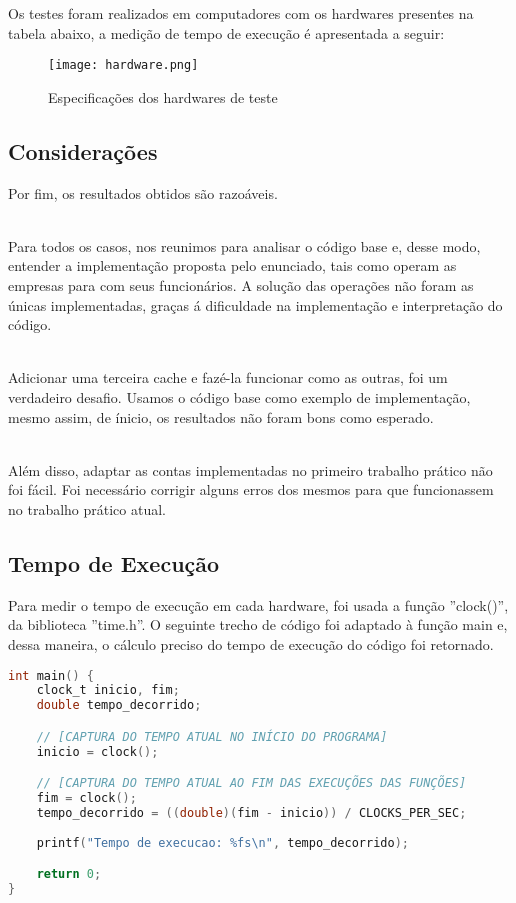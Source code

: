 \documentclass{article}
\begin{document}
Os testes foram realizados em computadores com os hardwares presentes na tabela abaixo, a medição de tempo de execução é apresentada a seguir:

\begin{figure}[!htb]
    \centering
    \texttt{[image: hardware.png]}
    \caption{Especificações dos hardwares de teste}
    \label{fig:frog}
\end{figure}

\subsection{Considerações}
Por fim, os resultados obtidos são razoáveis. 

\\Para todos os casos, nos reunimos para analisar o código base e, desse modo, entender a implementação proposta pelo enunciado, tais como operam as empresas para com seus funcionários. A solução das operações não foram as únicas implementadas, graças á dificuldade na implementação e interpretação do código.

\\Adicionar uma terceira cache e fazé-la funcionar como as outras, foi um verdadeiro desafio. Usamos o código base como exemplo de implementação, mesmo assim, de ínicio, os resultados não foram bons como esperado. 

\\Além disso, adaptar as contas implementadas no primeiro trabalho prático não foi fácil. Foi necessário corrigir alguns erros dos mesmos para que funcionassem no trabalho prático atual.

\subsection{Tempo de Execução}
Para medir o tempo de execução em cada hardware, foi usada a função ''clock()'', da biblioteca ''time.h''. O seguinte trecho de código foi adaptado à função main e, dessa maneira, o cálculo preciso do tempo de execução do código foi retornado.
\begin{lstlisting}[caption={Exemplo de código para a operação de divisão.},label={lst:cod1},language=C]
int main() {
    clock_t inicio, fim;
    double tempo_decorrido;

    // [CAPTURA DO TEMPO ATUAL NO INÍCIO DO PROGRAMA]
    inicio = clock();

    // [CAPTURA DO TEMPO ATUAL AO FIM DAS EXECUÇÕES DAS FUNÇÕES]
    fim = clock();
    tempo_decorrido = ((double)(fim - inicio)) / CLOCKS_PER_SEC;
    
    printf("Tempo de execucao: %fs\n", tempo_decorrido);

    return 0;
}
\end{lstlisting}
\end{document}
